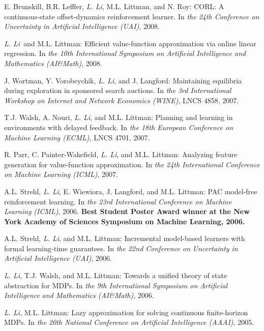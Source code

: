 \documentclass[10pt,twoside,letterpaper]{article}
\newcommand{\selffont}[1]{{\textit{#1}}}
\newcommand{\venuefont}[1]{{\textit{#1}}}
\newcommand{\myself}{\selffont{L. Li}}
\begin{document}
\begin{compactenum}[(C1)]
\item{E. Brunskill, B.R. Leffler, \myself, M.L. Littman, and N.
Roy: CORL: A continuous-state offset-dynamics reinforcement
learner.  In \venuefont{the 24th Conference on Uncertainty in
Artificial Intelligence (UAI)}, 2008.}

\item{\myself\ and M.L. Littman: Efficient value-function
approximation via online linear regression.  In \venuefont{the 10th
International Symposium on Artificial Intelligence and Mathematics
(AI\&Math)}, 2008.}

\item{J. Wortman, Y. Vorobeychik, \myself, and J. Langford:
Maintaining equilibria during exploration in sponsored search
auctions.  In \venuefont{the 3rd International Workshop on Internet
and Network Economics (WINE)}, LNCS 4858, 2007.}

\item{T.J. Walsh, A. Nouri, \myself, and M.L. Littman:
Planning and learning in environments with delayed feedback.  In
\venuefont{the 18th European Conference on Machine Learning
(ECML)}, LNCS 4701, 2007.}

\item{R. Parr, C. Painter-Wakefield, \myself, and M.L.
Littman: Analyzing feature generation for value-function
approximation.  In \venuefont{the 24th International
Conference on Machine Learning (ICML)}, 2007.}

\item{A.L. Strehl, \myself, E. Wiewiora, J. Langford, and M.L. Littman: PAC model-free reinforcement learning.  In \venuefont{the 23rd International Conference on Machine Learning (ICML)}, 2006.  \textbf{Best Student Poster Award winner at the New York Academy of Sciences Symposium on Machine Learning, 2006.}}

\item{A.L. Strehl, \myself, and M.L. Littman: Incremental model-based learners with formal learning-time guarantees.  In \venuefont{the 22nd Conference on Uncertainty in Artificial Intelligence (UAI)}, 2006.}

\item{\myself, T.J. Walsh, and M.L. Littman: Towards a unified theory of state abstraction for MDPs. In \venuefont{the 9th International Symposium on Artificial Intelligence and Mathematics (AI\&Math)}, 2006.}

\item{\myself, M.L. Littman: Lazy approximation for solving continuous finite-horizon MDPs. In \venuefont{the 20th National Conference on Artificial Intelligence (AAAI)}, 2005.}


\end{compactenum}
\end{document}
